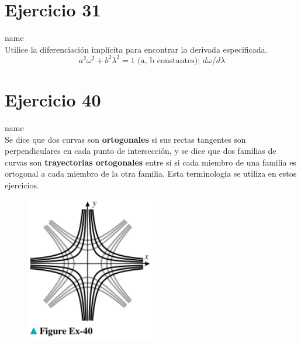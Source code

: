 \documentclass[12pt]{article}
\begin{document}
\section{Ejercicio 31} name \\

Utilice la diferenciación implícita para encontrar la derivada especificada.
\[ a^2 \omega^2 + b^2 \lambda^2 = 1 \text{ (a, b constantes); } d\omega /d\lambda \]

\section{Ejercicio 40} name \\

Se dice que dos curvas son \textbf{ortogonales} si sus rectas tangentes son perpendiculares en cada punto de intersección, y se dice que dos familias de curvas son \textbf{trayectorias ortogonales} entre sí si cada miembro de una familia es ortogonal a cada miembro de la otra familia. Esta terminología se utiliza en estos ejercicios.
\begin{figure}[h!]
\centering
\includegraphics[width=0.5\textwidth]{../img/img_Lista2/3_40.png}
\end{figure}
\end{document}

